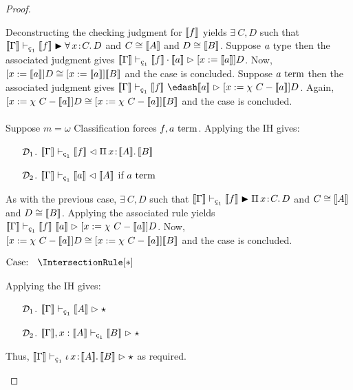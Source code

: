 \begin{proof}
\begin{proofcase}
        Deconstructing the checking judgment for $\llbracket f \rrbracket$ yields $\exists\ C, D$ such that $\sema{\Gamma} \vdash_{\oldced} \sema{f} \cinfr \abs{\forall}{x}{C}{D}$ and $C \cong \llbracket A \rrbracket$ and $D \cong \llbracket B \rrbracket$.
        Suppose $a~\textnormal{type}$ then the associated judgment gives $\sema{\Gamma} \vdash_{\oldced} \sema{f} \cdot \sema{a} \infr [x := \sema{a}]D$.
        Now, $[x := \llbracket a \rrbracket]D \cong [x := \llbracket a \rrbracket]\llbracket B \rrbracket$ and the case is concluded.
        Suppose $a~\textnormal{term}$ then the associated judgment gives $\sema{\Gamma} \vdash_{\oldced} \sema{f}\ \edash \sema{a} \infr [x := \chi\ C - \sema{a}]D$.
        Again, $[x := \chi\ C - \llbracket a \rrbracket]D \cong [x := \chi\ C - \llbracket a \rrbracket]\llbracket B \rrbracket$ and the case is concluded.
        \\ \\
        Suppose $m = \omega$
        Classification forces $f, a~\textnormal{term}$.
        Applying the IH gives:
        \begin{enumerate}
            \item[$\mathcal{D}_{1}$.] $\sema{\Gamma} \vdash_{\oldced} \sema{f} \chck \abs{\Pi}{x}{\sema{A}}{\sema{B}}$
            \item[$\mathcal{D}_{2}$.] $\sema{\Gamma} \vdash_{\oldced} \sema{a} \chck \sema{A}$ if $a~\textnormal{term}$
        \end{enumerate}
        As with the previous case, $\exists\ C, D$ such that $\sema{\Gamma} \vdash_{\oldced} \sema{f} \cinfr \abs{\Pi}{x}{C}{D}$ and $C \cong \llbracket A \rrbracket$ and $D \cong \llbracket B \rrbracket$.
        Applying the associated rule yields $\sema{\Gamma} \vdash_{\oldced} \sema{f}\ \sema{a} \infr [x := \chi\ C - \sema{a}]D$.
        Now, $[x := \chi\ C - \llbracket a \rrbracket]D \cong [x := \chi\ C - \llbracket a \rrbracket]\llbracket B \rrbracket$ and the case is concluded.
    \end{proofcase}

    $\text{Case: }\begin{array}{c} \IntersectionRule[*] \end{array}$
    \begin{proofcase}
        Applying the IH gives:
        \begin{enumerate}
            \item[$\mathcal{D}_{1}$.] $\sema{\Gamma} \vdash_{\oldced} \sema{A} \infr \star$
            \item[$\mathcal{D}_{2}$.] $\sema{\Gamma}, x : \sema{A} \vdash_{\oldced} \sema{B} \infr \star$
        \end{enumerate}
        Thus, $\sema{\Gamma} \vdash_{\oldced} \abs{\iota}{x}{\sema{A}}{\sema{B}} \infr \star$ as required.
    \end{proofcase}


\end{proof}
